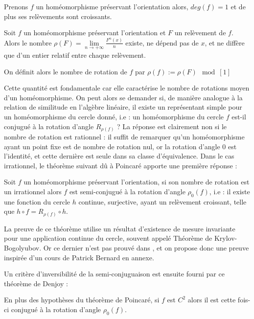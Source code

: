 \documentclass[11pt,a4paper]{article}
\begin{document}
\begin{prop}
Prenons $f$ un homéomorphisme préservant l'orientation alors, $deg(f)=1$ et de plus ses relèvements sont croissants.
\end{prop}

\begin{prop}
Soit $f$ un homéomorphisme préservant l'orientation et $F$ un relèvement de $f$. Alors le nombre $\rho (F)=\displaystyle \lim\limits_{n \to +\infty} \frac{F^n(x)}{n}$ existe, ne dépend pas de $x$, et ne diffère que d'un entier relatif entre chaque relèvement.
\end{prop}

\begin{defin}
On définit alors le nombre de rotation de $f$ par $\rho(f) := \rho (F) \mod[1]$
\end{defin}
Cette quantité est fondamentale car elle caractérise le nombre de rotations moyen d'un homéomorphisme. On peut alors se demander si, de manière analogue à la relation de similitude en l'algèbre linéaire, il existe un représentant simple pour un homéomorphisme du cercle donné, i.e : un homéomorphisme du cercle $f$ est-il conjugué à la rotation d'angle $R_{\rho(f)}$ ? La réponse est clairement non si le nombre de rotation est rationnel : il suffit de remarquer qu'un homéomorphisme ayant un point fixe est de nombre de rotation nul, or la rotation d'angle $0$ est l'identité, et cette dernière est seule dans sa classe d'équivalence. Dans le cas irrationnel, le théorème suivant dû à Poincaré apporte une première réponse :
\begin{thm}[Poincaré]\label{poincare}
Soit $f$ un homéomorphisme préservant l'orientation, si son nombre de rotation est un irrationnel alors $f$ est semi-conjugué à la rotation d'angle $\rho_0(f)$, i.e : il existe une fonction du cercle $h$ continue, surjective, ayant un relèvement croissant, telle que $h\circ f = R_{\rho(f)} \circ h$.
\end{thm}
\begin{rmq}
La preuve de ce théorème utilise un résultat d'existence de mesure invariante pour une application continue du cercle, souvent appelé Théorème de Krylov-Bogolyubov. Or ce dernier n'est pas prouvé dans \cite{dgv}, et on propose donc une preuve inspirée d'un cours de Patrick Bernard en annexe.
\end{rmq}

Un critère d'inversibilité de la semi-conjuguaison est ensuite fourni par ce théorème de Denjoy :
\begin{thm}[Denjoy]\label{denjoy}
En plus des hypothèses du théorème de Poincaré, si $f$ est $C^2$ alors il est cette fois-ci conjugué à la rotation d'angle $\rho_0(f)$.
\end{thm}
\end{document}
